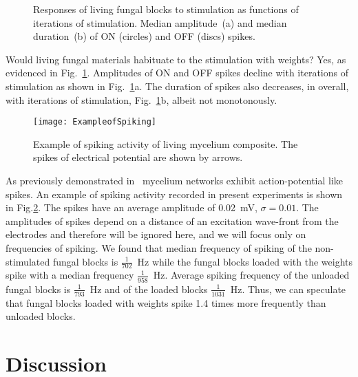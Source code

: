 \documentclass[]{elsarticle}
\begin{document}
\begin{figure}[!tbp]
    \centering
    \caption{Responses of living fungal blocks to stimulation as functions of iterations of stimulation. Median amplitude~(a) and median duration~(b) of ON (circles) and OFF (discs) spikes.}
    \label{fig:responsesVSiterations}
\end{figure}

Would living fungal materials habituate to the stimulation with weights? Yes, as evidenced in Fig.~\ref{fig:responsesVSiterations}. Amplitudes of ON and OFF spikes decline with iterations of stimulation as shown in Fig.~\ref{fig:responsesVSiterations}a. The duration of spikes also decreases, in overall, with iterations of stimulation,  Fig.~\ref{fig:responsesVSiterations}b, albeit not monotonously.  

\begin{figure}[!tbp]
    \centering
    \texttt{[image: ExampleofSpiking]}
    \caption{Example of spiking activity of living mycelium composite. The spikes of electrical potential are shown by arrows.}
    \label{fig:exampleSpiking}
\end{figure}

As previously demonstrated in~\cite{olsson1995action,adamatzky2018spiking,adamatzky2018towards} mycelium networks exhibit action-potential like spikes. An example of spiking activity recorded in present experiments is shown in Fig.\ref{fig:exampleSpiking}. The spikes have an average amplitude of 0.02~mV, $\sigma=0.01$. The amplitudes of spikes depend on a distance of an excitation wave-front from the electrodes and therefore will be ignored here, and we will focus only on frequencies of spiking. We found that median frequency of spiking of the non-stimulated fungal blocks is $\frac{1}{702}$~Hz while the fungal blocks loaded with the weights spike with a median frequency $\frac{1}{958}$~Hz. Average spiking frequency of the unloaded fungal blocks is $\frac{1}{793}$~Hz and of the loaded blocks $\frac{1}{1031}$~Hz. Thus, we can speculate that fungal blocks loaded with weights spike 1.4 times more frequently than unloaded blocks.  




\section{Discussion}
\end{document}
